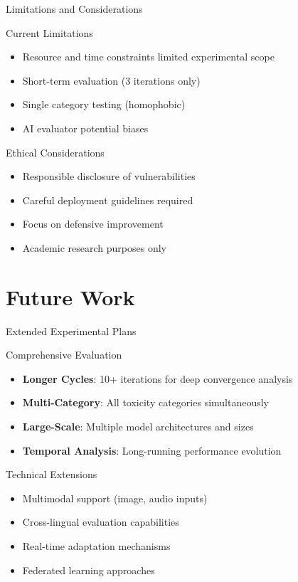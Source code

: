 \documentclass[aspectratio=169]{beamer}
\begin{document}
\begin{frame}{Limitations and Considerations}
\begin{block}{Current Limitations}
\begin{itemize}
\item Resource and time constraints limited experimental scope
\item Short-term evaluation (3 iterations only)
\item Single category testing (homophobic)
\item AI evaluator potential biases
\end{itemize}
\end{block}

\begin{block}{Ethical Considerations}
\begin{itemize}
\item Responsible disclosure of vulnerabilities
\item Careful deployment guidelines required
\item Focus on defensive improvement
\item Academic research purposes only
\end{itemize}
\end{block}
\end{frame}

\section{Future Work}

\begin{frame}{Extended Experimental Plans}
\begin{block}{Comprehensive Evaluation}
\begin{itemize}
\item \textbf{Longer Cycles}: 10+ iterations for deep convergence analysis
\item \textbf{Multi-Category}: All toxicity categories simultaneously
\item \textbf{Large-Scale}: Multiple model architectures and sizes
\item \textbf{Temporal Analysis}: Long-running performance evolution
\end{itemize}
\end{block}

\begin{block}{Technical Extensions}
\begin{itemize}
\item Multimodal support (image, audio inputs)
\item Cross-lingual evaluation capabilities
\item Real-time adaptation mechanisms
\item Federated learning approaches
\end{itemize}
\end{block}
\end{frame}
\end{document}
